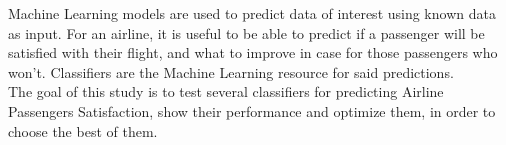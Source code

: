 
\begin{center}
    \begin{minipage}{0.85\textwidth}
        Machine Learning models are used to predict data of interest using known data as input.
        For an airline, it is useful to be able to predict if a passenger will be satisfied with their flight, and what to improve in case for those passengers who won't.
        Classifiers are the Machine Learning resource for said predictions.\\
        The goal of this study is to test several classifiers for predicting Airline Passengers Satisfaction, show their performance and optimize them, in order to choose the best of them.
    \end{minipage}
\end{center}
